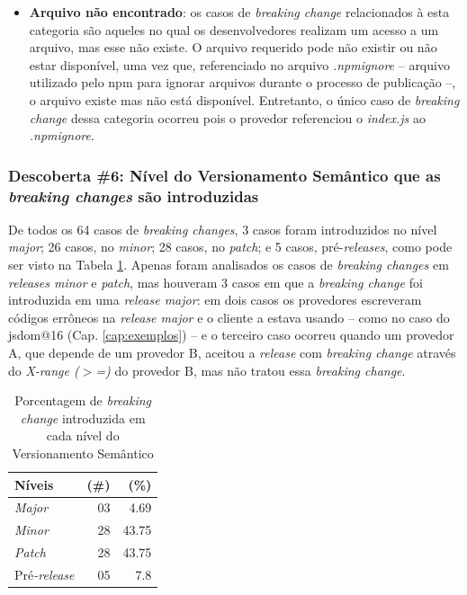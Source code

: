 \begin{itemize}
    \item \textbf{Arquivo não encontrado}: os casos de \textit{breaking change} relacionados à esta categoria são aqueles no qual os desenvolvedores realizam um acesso a um arquivo, mas esse não existe. O arquivo requerido pode não existir ou não estar disponível, uma vez que, referenciado no arquivo \textit{.npmignore} -- arquivo utilizado pelo \textsf{npm} para ignorar arquivos durante o processo de publicação --, o arquivo existe mas não está disponível. Entretanto, o único caso de \textit{breaking change} dessa categoria ocorreu pois o provedor referenciou o \textit{index.js} ao \textit{.npmignore}.
\end{itemize}{}

\subsubsection{Descoberta \#6: Nível do Versionamento Semântico que as \textit{breaking changes} são introduzidas}

De todos os 64 casos de \textit{breaking changes}, 3 casos foram introduzidos no nível \textit{major}; 26 casos, no \textit{minor}; 28 casos, no \textit{patch}; e 5 casos, pré-\textit{releases}, como pode ser visto na Tabela \ref{tab:semver_levels}. Apenas foram analisados os casos de \textit{breaking changes} em \textit{releases minor} e \textit{patch}, mas houveram 3 casos em que a \textit{breaking change} foi introduzida em uma \textit{release major}: em dois casos os provedores escreveram códigos errôneos na \textit{release major} e o cliente a estava usando -- como no caso do \textsf{jsdom@16} (Cap. \ref{cap:exemplos}) -- e o terceiro caso ocorreu quando um provedor \textsf{A}, que depende de um provedor \textsf{B}, aceitou a \textit{release} com \textit{breaking change} através do \textit{X-range ($>$=)} do provedor \textsf{B}, mas não tratou essa \textit{breaking change}.

\begin{table}
	\centering
	\caption{Porcentagem de \textit{breaking change} introduzida em cada nível do Versionamento Semântico}
	\begin{tabular}{lrr}
		\toprule
		\textbf{Níveis} & \textbf{(\#)} & \textbf{(\%)} \\ \hline
		\textit{Major}       & 03       & 4.69          \\
		\textit{Minor}       & 28       & 43.75         \\
		\textit{Patch}       & 28       & 43.75         \\
		Pré\textit{-release} & 05       & 7.8           \\ \bottomrule
	\end{tabular}
	\label{tab:semver_levels}
\end{table}

